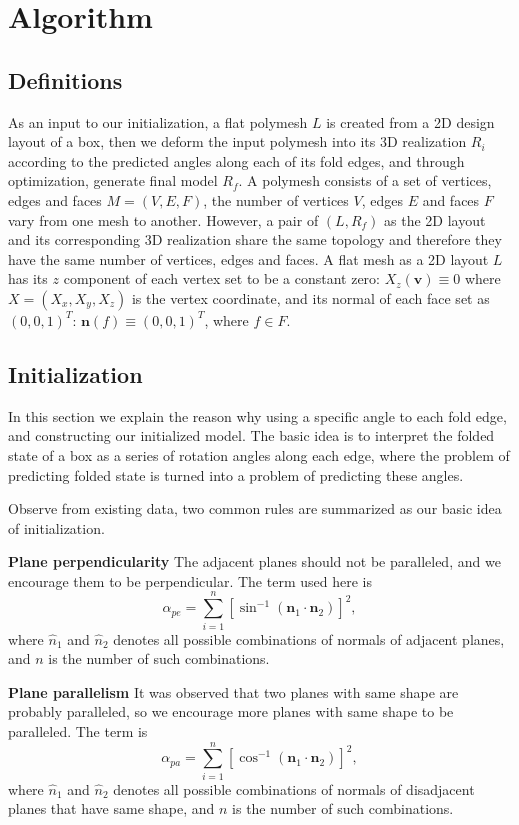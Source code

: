 \section{Algorithm}\label{sec:optimization}
\subsection{Definitions}
As an input to our initialization, a flat polymesh $L$ is created from a 2D design layout of a box, then we deform the input polymesh into its 3D realization $R_i$ according to the predicted angles along each of its fold edges, and through optimization, generate final model $R_f$. A polymesh consists of a set of vertices, edges and faces $M = (V,E,F)$, the number of vertices $V$, edges $E$ and faces $F$ vary from one mesh to another. However, a pair of $(L,R_f)$ as the 2D layout and its corresponding 3D realization share the same topology and therefore they have the same number of vertices, edges and faces. A flat mesh as a 2D layout $L$ has its $z$ component of each vertex set to be a constant zero: $X_z(\mathbf{v}) \equiv 0$ where $X = (X_x,X_y,X_z)$ is the vertex coordinate, and its normal of each face set as $(0,0,1)^T$: $\mathbf{n}(f) \equiv (0,0,1)^T$, where $f \in F$.

\subsection{Initialization}\label{sec:initialization}
In this section we explain the reason why using a specific angle to each fold edge, and constructing our initialized model. The basic idea is to interpret the folded state of a box as a series of rotation angles along each edge, where the problem of predicting folded state is turned into a problem of predicting these angles.

Observe from existing data, two common rules are summarized as our basic idea of initialization.

\noindent
\textbf{Plane perpendicularity} The adjacent planes should not be paralleled, and we encourage them to be perpendicular. The term used here is
\begin{equation}
\alpha_{pe} = \sum_{i = 1}^{n} [\sin^{-1}(\mathbf{n}_1 \cdot \mathbf{n}_2)]^{2},
\label{equ:perp}
\end{equation}
where $\hat{n}_1$ and $\hat{n}_2$ denotes all possible combinations of normals of adjacent planes, and $n$ is the number of such combinations.

\noindent
\textbf{Plane parallelism} It was observed that two planes with same shape are probably paralleled, so we encourage more planes with same shape to be paralleled. The term is
\begin{equation}
\alpha_{pa} = \sum_{i = 1}^{n} [\cos^{-1}(\mathbf{n}_1 \cdot \mathbf{n}_2)]^{2},
\label{equ:para}
\end{equation}
where $\hat{n}_1$ and $\hat{n}_2$ denotes all possible combinations of normals of disadjacent planes that have same shape,  and $n$ is the number of such combinations.

